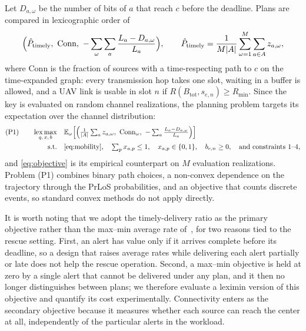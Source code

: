 Let $D_{a,\omega}$ be the number of bits of $a$ that reach $c$ before the deadline. Plans are compared in lexicographic order of
\begin{equation}
\label{eq:objective}
\Bigl(\hat P_{\mathrm{timely}},\ \mathrm{Conn},\ -\sum_{\omega}\sum_{a}\frac{L_a-D_{a,\omega}}{L_a}\Bigr),
\qquad
\hat P_{\mathrm{timely}}=\frac{1}{M\abs{A}}\sum_{\omega=1}^{M}\sum_{a\in A}z_{a,\omega},
\end{equation}
where $\mathrm{Conn}$ is the fraction of sources with a time-respecting path to $c$ on the time-expanded graph: every transmission hop takes one slot, waiting in a buffer is allowed, and a UAV link is usable in slot $n$ if $R(B_{\mathrm{tot}},s_{e,n})\ge R_{\min}$. Since the key is evaluated on random channel realizations, the planning problem targets its expectation over the channel distribution:
\begin{equation}
\label{eq:p1}
\begin{aligned}
\text{(P1)}\qquad \operatorname*{lex\,max}_{q,\,x,\,b}\quad & \E_{\omega}\Bigl[\Bigl(\tfrac{1}{\abs{A}}\textstyle\sum_{a} z_{a,\omega},\ \mathrm{Conn}_\omega,\ -\sum_{a}\tfrac{L_a-D_{a,\omega}}{L_a}\Bigr)\Bigr]\\
\text{s.t.}\quad & \eqref{eq:mobility},\quad \textstyle\sum_p x_{a,p}\le 1,\quad x_{a,p}\in\set{0,1},\quad b_{e,n}\ge 0,\quad \text{and constraints 1--4},
\end{aligned}
\end{equation}
and \eqref{eq:objective} is its empirical counterpart on $M$ evaluation realizations. Problem (P1) combines binary path choices, a non-convex dependence on the trajectory through the PrLoS probabilities, and an objective that counts discrete events, so standard convex methods do not apply directly.

It is worth noting that we adopt the timely-delivery ratio as the primary objective rather than the max--min average rate of~\cite{huang2025ddatsap}, for two reasons tied to the rescue setting. First, an alert has value only if it arrives complete before its deadline, so a design that raises average rates while delivering each alert partially or late does not help the rescue operation. Second, a max--min objective is held at zero by a single alert that cannot be delivered under any plan, and it then no longer distinguishes between plans; we therefore evaluate a leximin version of this objective and quantify its cost experimentally. Connectivity enters as the secondary objective because it measures whether each source can reach the center at all, independently of the particular alerts in the workload.

